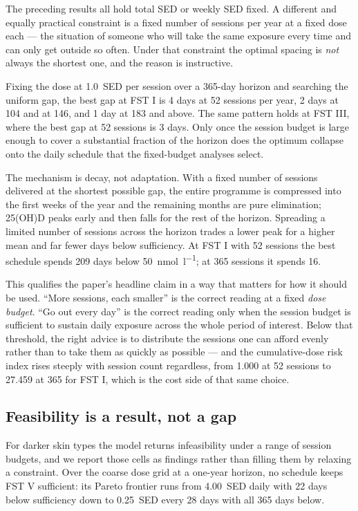 \documentclass[11pt]{article}
\newcommand{\nmol}{\si{\nano\mole\per\litre}}
\newcommand{\SED}{SED}
\begin{document}
The preceding results all hold total \SED{} or weekly \SED{} fixed. A
different and equally practical constraint is a fixed number of
sessions per year at a fixed dose each --- the situation of someone who
will take the same exposure every time and can only get outside so
often. Under that constraint the optimal spacing is \emph{not} always
the shortest one, and the reason is instructive.

Fixing the dose at \SI{1.0}{\SED} per session over a 365-day horizon
and searching the uniform gap, the best gap at FST I is 4 days at 52
sessions per year, 2 days at 104 and at 146, and 1 day at 183 and
above. The same pattern holds at FST III, where the best gap at 52
sessions is 3 days.
Only once the session budget is large enough to cover a substantial
fraction of the horizon does the optimum collapse onto the daily
schedule that the fixed-budget analyses select.

The mechanism is decay, not adaptation. With a fixed number of
sessions delivered at the shortest possible gap, the entire programme
is compressed into the first weeks of the year and the remaining
months are pure elimination; 25(OH)D peaks early and then falls for
the rest of the horizon. Spreading a limited number of sessions across
the horizon trades a lower peak for a higher mean and far fewer days
below sufficiency. At FST I with 52 sessions the best schedule spends
209 days below \SI{50}{\nmol}; at 365 sessions it spends 16.

This qualifies the paper's headline claim in a way that matters for
how it should be used. ``More sessions, each smaller'' is the correct
reading at a fixed \emph{dose budget}. ``Go out every day'' is the
correct reading only when the session budget is sufficient to sustain
daily exposure across the whole period of interest. Below that
threshold, the right advice is to distribute the sessions one can
afford evenly rather than to take them as quickly as possible --- and
the cumulative-dose risk index rises steeply with session count
regardless, from 1.000 at 52 sessions to 27.459 at 365 for FST I,
which is the cost side of that same choice.

\subsection{Feasibility is a result, not a gap}

For darker skin types the model returns infeasibility under a range of
session budgets, and we report those cells as findings rather than
filling them by relaxing a constraint. Over the coarse dose grid at a
one-year horizon, no schedule keeps FST V sufficient: its Pareto
frontier runs from \SI{4.00}{\SED} daily with 22 days below
sufficiency down to \SI{0.25}{\SED} every 28 days with all 365 days
below.
\end{document}
